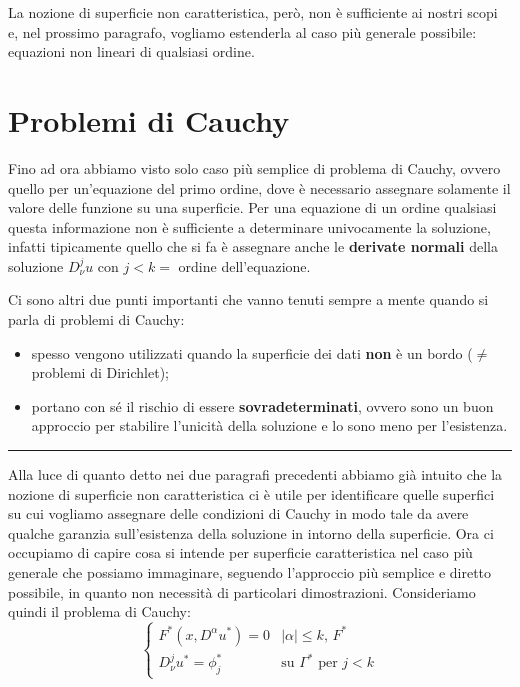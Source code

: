 La nozione di superficie non caratteristica, però, non è sufficiente ai nostri scopi e, nel prossimo paragrafo, vogliamo estenderla al caso più generale possibile: equazioni non lineari di qualsiasi ordine.

\newpage
\section{Problemi di Cauchy} \label{pb}

Fino ad ora abbiamo visto solo caso più semplice di problema di Cauchy, ovvero quello per un'equazione del primo ordine, dove è necessario assegnare solamente il valore delle funzione su una superficie. Per una equazione di un ordine qualsiasi questa informazione non è sufficiente a determinare univocamente la soluzione, infatti tipicamente quello che si fa è assegnare anche le \textbf{derivate normali} della soluzione $D^j_\nu u$ con $j<k=$ ordine dell'equazione. 

Ci sono altri due punti importanti che vanno tenuti sempre a mente quando si parla di problemi di Cauchy:
\begin{itemize}
\item spesso vengono utilizzati quando la superficie dei dati \textbf{non} è un bordo ($\neq$ problemi di Dirichlet);
\item portano con sé il rischio di essere \textbf{sovradeterminati}, ovvero sono un buon approccio per stabilire l'unicità della soluzione e lo sono meno per l'esistenza.
\end{itemize}

\noindent\rule[0.5ex]{\linewidth}{0.2pt}

Alla luce di quanto detto nei due paragrafi precedenti abbiamo già intuito che la nozione di superficie non caratteristica ci è utile per identificare quelle superfici su cui vogliamo assegnare delle condizioni di Cauchy in modo tale da avere qualche garanzia sull'esistenza della soluzione in intorno della superficie. Ora ci occupiamo di capire cosa si intende per superficie caratteristica nel caso più generale che possiamo immaginare, seguendo l'approccio più semplice e diretto possibile, in quanto non necessità di particolari dimostrazioni.
Consideriamo quindi il problema di Cauchy:
\begin{equation}
\begin{cases}
F^*(x,D^\alpha u^*)=0 & |\alpha | \leq k, \, F^*\\
D^j_\nu u^* = \phi_j^* & \text{su } \Gamma^* \text{ per }j<k 
\end{cases}
\end{equation}

